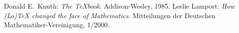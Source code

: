 \begin{thebibliography}{00000}
   Donald E.~Knuth: {\it The
    TeXbook}. Addison-Wesley, 1985. 
   Leslie Lamport: {\it How (La)TeX
    changed the face of Mathematics}. Mitteilungen der Deutschen
     Mathematiker-Vereinigung, 1/2000.
\end{thebibliography}